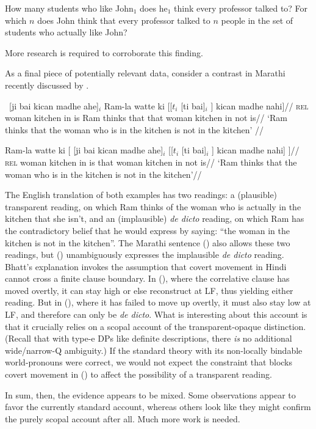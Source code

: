 \pex
\a How many students who like John$_{1}$ does he$_{1}$ think every professor talked to? 
\a For which $n$ does John think that every professor talked to $n$ people in the set of students who actually like John?
\xe

More research is required to corroborate this finding.

As a final piece of potentially relevant data, consider a contrast in Marathi recently discussed by \citet{bhatt:locality:99}.

\ex
\begingl
\gla\ [ji bai kican madhe ahe]$_{i}$ Ram-la watte ki [[$t_{i}$ [ti bai]$_{i}$ ] kican madhe nahi]//
\glb \textsc{rel} woman kitchen in is Ram thinks that that woman kitchen in not is//
\glft `Ram thinks that the woman who is in the kitchen is not in the kitchen' //
\endgl
\xe

\ex
\begingl
\gla Ram-la watte ki [ [ji bai kican madhe ahe]$_{i}$ [[$t_{i}$ [ti bai]$_{i}$ ] kican madhe nahi] ]//
\glb \textsc{rel} woman kitchen in is that woman kitchen in not is//
\glft `Ram thinks that the woman who is in the kitchen is not in the kitchen'//
\endgl
\xe

The English translation of both examples has two readings: a (plausible) transparent reading, on which Ram thinks of the woman who is actually in the kitchen that she isn't, and an (implausible) \emph{de dicto} reading, on which Ram has the contradictory belief that he would express by saying: ``the woman in the kitchen is not in the kitchen''. The Marathi sentence (\blastx) also allows these two readings, but (\lastx) unambiguously expresses the implausible \emph{de dicto} reading. Bhatt's explanation invokes the assumption that covert movement in Hindi cannot cross a finite clause boundary. In (\blastx), where the correlative clause has moved overtly, it can stay high or else reconstruct at LF, thus yielding either reading. But in (\lastx), where it has failed to move up overtly, it must also stay low at LF, and therefore can only be \emph{de dicto}. What is interesting about this account is that it crucially relies on a scopal account of the transparent-opaque distinction. (Recall that with type-e DPs like definite descriptions, there \emph{is} no additional wide/narrow-Q ambiguity.) If the standard theory with its non-locally bindable world-pronouns were correct, we would not expect the constraint that blocks covert movement in (\lastx) to affect the possibility of a transparent reading.

In sum, then, the evidence appears to be mixed. Some observations appear to favor the currently standard account, whereas others look like they might confirm the purely scopal account after all. Much more work is needed.

